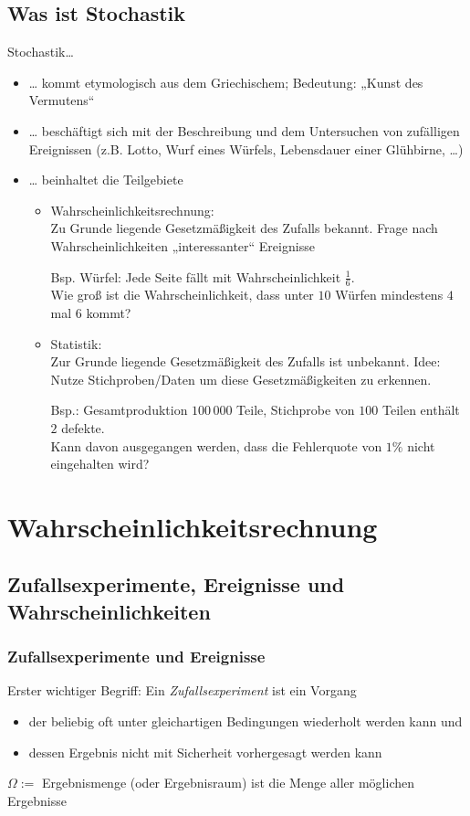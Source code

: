 \section*{Was ist Stochastik}
Stochastik…
\begin{itemize}
\item … kommt etymologisch aus dem Griechischem; Bedeutung: „Kunst des Vermutens“
\item … beschäftigt sich mit der Beschreibung und dem Untersuchen von zufälligen Ereignissen (z.B. Lotto, Wurf eines Würfels, Lebensdauer einer Glühbirne, …)
\item … beinhaltet die Teilgebiete
\begin{itemize}
\item Wahrscheinlichkeitsrechnung:\\
Zu Grunde liegende Gesetzmäßigkeit des Zufalls bekannt. Frage nach Wahrscheinlichkeiten „interessanter“ Ereignisse

Bsp. Würfel: Jede Seite fällt mit Wahrscheinlichkeit $\frac{1}{6}$. \\
Wie groß ist die Wahrscheinlichkeit, dass unter $10$ Würfen mindestens $4$ mal 6 kommt? 
\item Statistik:\\
Zur Grunde liegende Gesetzmäßigkeit des Zufalls ist unbekannt. Idee: Nutze Stichproben/Daten um diese Gesetzmäßigkeiten zu erkennen.

Bsp.: Gesamtproduktion $100\,000$ Teile, Stichprobe von $100$ Teilen enthält $2$ defekte. \\
Kann davon ausgegangen werden, dass die Fehlerquote von $1\%$ nicht eingehalten wird?
\end{itemize}
\end{itemize}

\chapter{Wahrscheinlichkeitsrechnung}
\section{Zufallsexperimente, Ereignisse und Wahrscheinlichkeiten}
\subsection{Zufallsexperimente und Ereignisse}
Erster wichtiger Begriff:
Ein \emph{Zufallsexperiment} ist ein Vorgang
\begin{itemize}
\item der beliebig oft unter gleichartigen Bedingungen wiederholt werden kann und
\item dessen Ergebnis nicht mit Sicherheit vorhergesagt werden kann
\end{itemize}
$\Omega:=$ Ergebnismenge (oder Ergebnisraum) ist die Menge aller möglichen Ergebnisse

